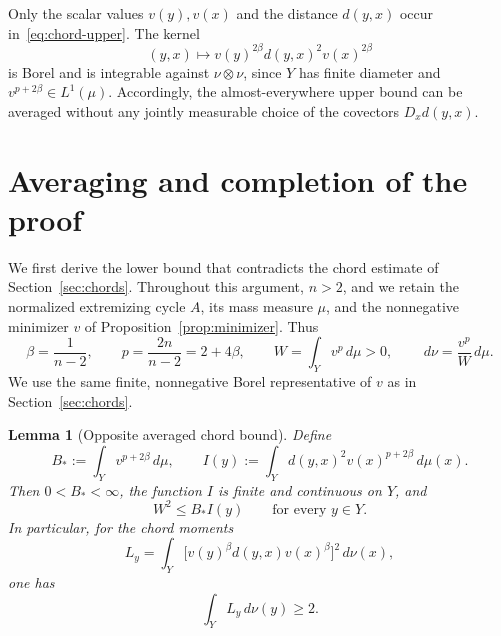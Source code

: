 \documentclass[11pt]{article}
\numberwithin{equation}{section}
\newtheorem{lemma}[theorem]{Lemma}
\theoremstyle{definition}
\theoremstyle{remark}
\begin{document}
Only the scalar values $v(y),v(x)$ and the distance $d(y,x)$
occur in~\eqref{eq:chord-upper}. The kernel
\[
 (y,x)\longmapsto
          v(y)^{2\beta}d(y,x)^2v(x)^{2\beta}
\]
is Borel and is integrable against $\nu\otimes\nu$, since $Y$
has finite diameter and $v^{p+2\beta}\in L^1(\mu)$. Accordingly,
the almost-everywhere upper bound can be averaged without any
jointly measurable choice of the covectors $D_xd(y,x)$.

\section{Averaging and completion of the proof}
\label{sec:conclusion}

We first derive the lower bound that contradicts the chord estimate of
Section~\ref{sec:chords}. Throughout this argument, \(n>2\), and we retain
the normalized extremizing cycle \(A\), its mass measure \(\mu\), and the
nonnegative minimizer \(v\) of Proposition~\ref{prop:minimizer}. Thus
\[
 \beta=\frac1{n-2},\qquad p=\frac{2n}{n-2}=2+4\beta,
 \qquad W=\int_Y v^p\,d\mu>0,
 \qquad \,d\nu=\frac{v^p}{W}\,d\mu.
\]
We use the same finite, nonnegative Borel representative of \(v\) as in
Section~\ref{sec:chords}.

\begin{lemma}[Opposite averaged chord bound]
\label{lem:opposite-average}
Define
\begin{equation}
 \label{finish:weighted-moment}
 B_*:=\int_Y v^{p+2\beta}\,d\mu,
 \qquad
 I(y):=\int_Y d(y,x)^2v(x)^{p+2\beta}\,d\mu(x).
\end{equation}
Then \(0<B_*<\infty\), the function \(I\) is finite and continuous on
\(Y\), and
\begin{equation}
 \label{finish:all-centers}
 W^2\le B_*I(y)\qquad\text{for every }y\in Y.
\end{equation}
In particular, for the chord moments
\[
 L_y=\int_Y
       \bigl[v(y)^\beta d(y,x)v(x)^\beta\bigr]^2\,d\nu(x),
\]
one has
\begin{equation}
 \label{finish:opposite-average}
 \int_Y L_y\,d\nu(y)\ge2.
\end{equation}
\end{lemma}
\end{document}
